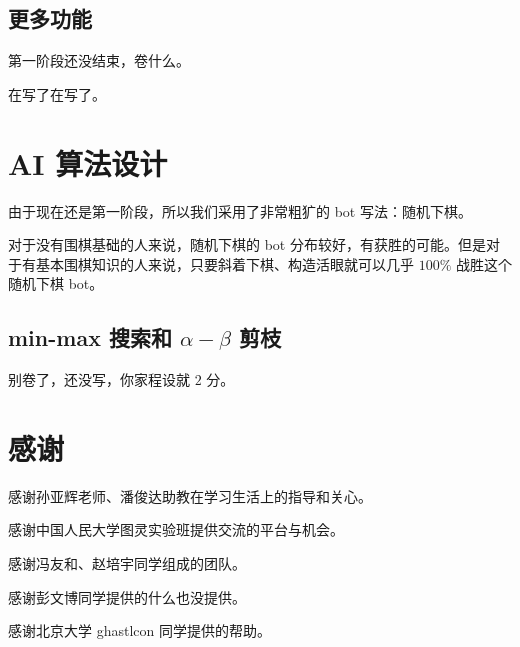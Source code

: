 \documentclass{noithesis}
\begin{document}
	\subsection{更多功能}
	
	第一阶段还没结束，卷什么。
	
	在写了在写了。
	
	\section{AI 算法设计}
	
	由于现在还是第一阶段，所以我们采用了非常粗犷的 bot 写法：随机下棋。
	
	对于没有围棋基础的人来说，随机下棋的 bot 分布较好，有获胜的可能。但是对于有基本围棋知识的人来说，只要斜着下棋、构造活眼就可以几乎 $100\%$ 战胜这个随机下棋 bot。
	
	\subsection{min-max 搜索和 $\alpha-\beta$ 剪枝}
	
	别卷了，还没写，你家程设就 $2$ 分。
	
	\section{感谢}
	
	感谢孙亚辉老师、潘俊达助教在学习生活上的指导和关心。
	
	感谢中国人民大学图灵实验班提供交流的平台与机会。
	
	感谢冯友和、赵培宇同学组成的团队。
	
	感谢彭文博同学提供的什么也没提供。
	
	感谢北京大学 ghastlcon 同学提供的帮助。
	
\end{document}
